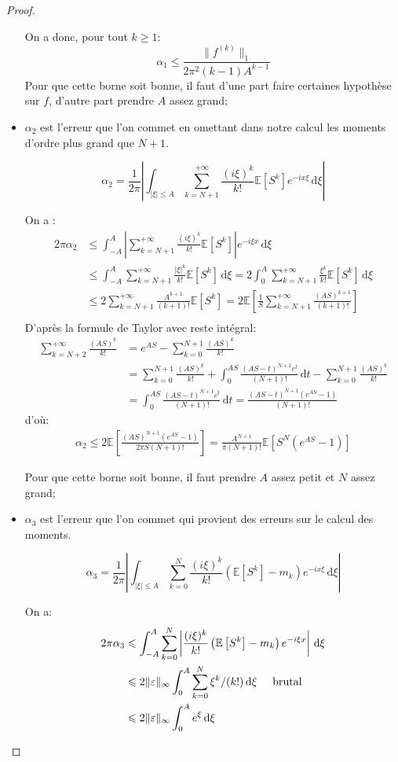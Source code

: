 \documentclass[12pt]{article}
\newcommand{\pth}[1]{\left(#1\right)}
\newcommand{\cro}[1]{\left[#1\right]}
\newcommand{\abs}[1]{\left|#1\right|}
\newcommand{\dabs}[1]{\|#1\|}
\newcommand{\comment}[1]{\hspace{0.5cm}\text{#1}\hspace{0cm}}
\newcommand{\de}{\,\mathrm{d}}
\newcommand{\Esp}[1]{\mathbb{E}\cro{#1}}
\begin{document}
\begin{proof}
\begin{itemize}
  On a donc, pour tout $k\geqslant 1$:
  \[\alpha_1\leqslant\frac{\dabs{f^{(k)}}_{1}}{2\pi^2(k-1)A^{k-1}}\] Pour que cette borne soit bonne, il faut d'une part faire certaines hypothèse sur $f$, d'autre part prendre $A$ assez grand;
\item $\alpha_2$ est l'erreur que l'on commet en omettant dans notre calcul les moments d'ordre plus grand que $N+1$.

\[\alpha_2 = \frac1{2\pi}\abs{\int_{\abs{\xi}\leqslant A}\sum_{k=N+1}^{+\infty}\frac{(i\xi)^k}{k!}\Esp{S^k}e^{-ix\xi}\de\xi}\]

On a :
  \begin{align*}
    2\pi\alpha_2&\leqslant \int_{-A}^A\abs{\sum_{k=N+1}^{+\infty}\frac{(i\xi)^k}{k!}\Esp{S^k}}e^{-i\xi x}\de\xi\\
    &\leqslant  \int_{-A}^A\sum_{k=N+1}^{+\infty}\frac{\abs{\xi}^k}{k!}\Esp{S^k}\de\xi=2 \int_{0}^A\sum_{k=N+1}^{+\infty}\frac{\xi^k}{k!}\Esp{S^k}\de\xi\\
    &\leqslant 2\sum_{k=N+1}^{+\infty}\frac{A^{k+1}}{(k+1)!}\Esp{S^k}=2\Esp{\frac{1}{S}\sum_{k=N+1}^{+\infty}\frac{(AS)^{k+1}}{(k+1)!}}\\
  \end{align*}
  D'après la formule de Taylor avec reste intégral:
  \begin{align*}
    \sum_{k=N+2}^{+\infty}\frac{(AS)^{k}}{k!}&=e^{AS}-\sum_{k=0}^{N+1}\frac{(AS)^{k}}{k!}\\
    &=\sum_{k=0}^{N+1}\frac{(AS)^{k}}{k!}+\int_{0}^{AS}\frac{(AS-t)^{N+1}e^t}{(N+1)!}\de t-\sum_{k=0}^{N+1}\frac{(AS)^{k}}{k!}\\
    &=\int_{0}^{AS}\frac{(AS-t)^{N+1}e^t}{(N+1)!}\de t = \frac{(AS-t)^{N+1}(e^{AS}-1)}{(N+1)!}
  \end{align*}
  d'où:
  \begin{align*}
    \alpha_2\leqslant 2\Esp{\frac{(AS)^{N+1}(e^{AS}-1)}{2\pi S(N+1)!}}=\frac{A^{N+1}}{\pi(N+1)!}\Esp{S^N(e^{AS}-1)}
  \end{align*}

  Pour que cette borne soit bonne, il faut prendre $A$ assez petit et $N$ assez grand;
\item $\alpha_3$ est l'erreur que l'on commet qui provient des erreurs sur le calcul des moments.

\[\alpha_3 = \frac1{2\pi}\abs{\int_{\abs{\xi}\leqslant A}\sum_{k=0}^{N}\frac{(i\xi)^k}{k!}\pth{\Esp{S^k}-m_k}e^{-ix\xi}\de\xi}\]

On a:
  \begin{align*} 
    2\pi\alpha_3&\leqslant \int_{-A}^A\sum_{k=0}^{N}\abs{\frac{(i\xi)^k}{k!}\pth{\Esp{S^k}-m_k}e^{-i\xi x}}\de\xi\\
    &\leqslant 2\dabs{\varepsilon}_{\infty}\int_{0}^A\sum_{k=0}^{N}\xi^k/(k!)\de\xi\comment{brutal}\\
    &\leqslant 2\dabs{\varepsilon}_{\infty}\int_{0}^Ae^{\xi}\de\xi
  \end{align*}


\end{itemize}
\end{proof}
\end{document}
